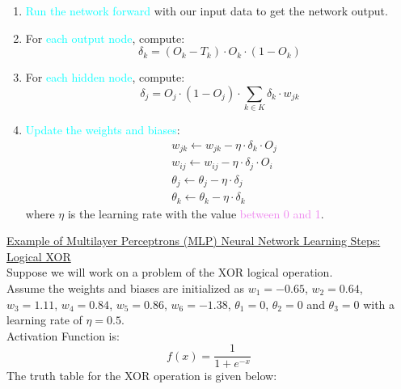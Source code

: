 \documentclass{book}
\begin{document}
\begin{enumerate}
    \item \textcolor{cyan}{Run the network forward} with our input data to get the network output.
    \item For \textcolor{cyan}{each output node}, compute:
    \[
        \delta_k = (O_k - T_k) \cdot O_k \cdot (1 - O_k)
    \]
    \item For \textcolor{cyan}{each hidden node}, compute:
    \[
        \delta_j = O_j \cdot (1 - O_j) \cdot \sum_{k \in K} \delta_k \cdot w_{jk}
    \]
    \item \textcolor{cyan}{Update the weights and biases}:\\
    \begin{align*}
        & w_{jk} \leftarrow w_{jk} - \eta \cdot \delta_k \cdot O_j\\
        & w_{ij} \leftarrow w_{ij} - \eta \cdot \delta_j \cdot O_i\\
        & \theta_j \leftarrow \theta_j - \eta \cdot \delta_j\\
        & \theta_k \leftarrow \theta_k - \eta \cdot \delta_k
    \end{align*}
    where \(\eta\) is the learning rate with the value \textcolor{violet}{between 0 and 1}.
\end{enumerate}
\vspace{2mm}
\underline{Example of Multilayer Perceptrons (MLP) Neural Network Learning Steps: Logical XOR}\\
Suppose we will work on a problem of the XOR logical operation.\\
Assume the weights and biases are initialized as \(w_1 = -0.65\), \(w_2 = 0.64\), \(w_3 = 1.11\), \(w_4 = 0.84\), \(w_5 = 0.86\), \(w_6 = -1.38\), \(\theta_1 = 0\), \(\theta_2 = 0\) and \(\theta_3 = 0\) with a learning rate of \(\eta = 0.5\).\\
Activation Function is:
\[
    f(x) = \frac{1}{1 + e^{-x}}\
\]
The truth table for the XOR operation is given below:\\
\end{document}
